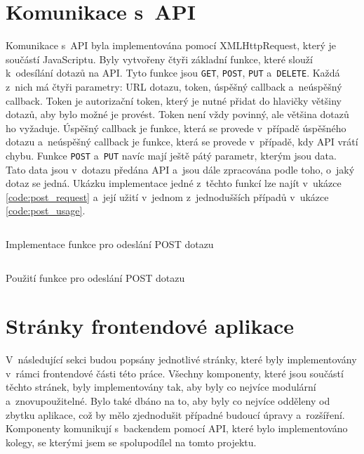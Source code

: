 \section{Komunikace s~API}
Komunikace s~API byla implementována pomocí XMLHttpRequest, který je součástí JavaScriptu. Byly vytvořeny čtyři základní funkce, které slouží k~odesílání dotazů na API. Tyto funkce jsou \texttt{GET}, \texttt{POST}, \texttt{PUT} a~\texttt{DELETE}. Každá z~nich má čtyři parametry: URL dotazu, token, úspěšný callback a~neúspěšný callback. Token je autorizační token, který je nutné přidat do hlavičky většiny dotazů, aby bylo možné je provést. Token není vždy povinný, ale většina dotazů ho vyžaduje. Úspěšný callback je funkce, která se provede v~případě úspěšného dotazu a~neúspěšný callback je funkce, která se provede v~případě, kdy API vrátí chybu. Funkce \texttt{POST} a~\texttt{PUT} navíc mají ještě pátý parametr, kterým jsou data. Tato data jsou v~dotazu předána API a~jsou dále zpracována podle toho, o~jaký dotaz se jedná. Ukázku implementace jedné z~těchto funkcí lze najít v~ukázce \ref{code:post_request} a~její užití v~jednom z~jednodušších případů v~ukázce \ref{code:post_usage}.

\begin{listing}[H]
  \inputminted[breaklines]{typescript}{resources/code/post_request.ts}
  \caption{Implementace funkce pro odeslání POST dotazu}
  \label{code:post_request}
\end{listing}

\begin{listing}[H]
  \inputminted[breaklines]{typescript}{resources/code/post_usage.ts}
  \caption{Použití funkce pro odeslání POST dotazu}
  \label{code:post_usage}
\end{listing}

\section{Stránky frontendové aplikace}
V~následující sekci budou popsány jednotlivé stránky, které byly implementovány v~rámci frontendové části této práce. Všechny komponenty, které jsou součástí těchto stránek, byly implementovány tak, aby byly co nejvíce modulární a~znovupoužitelné. Bylo také dbáno na to, aby byly co nejvíce odděleny od zbytku aplikace, což by mělo zjednodušit případné budoucí úpravy a~rozšíření. Komponenty komunikují s~backendem pomocí API, které bylo implementováno kolegy, se kterými jsem se spolupodílel na tomto projektu.

